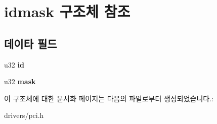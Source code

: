\section{idmask 구조체 참조}
\label{structidmask}
\subsection*{데이타 필드}
\begin{DoxyCompactItemize}
\item 
u32 {\bfseries id}\label{structidmask_a3501aa101a72a5acae8fc081f8f3f412}

\item 
u32 {\bfseries mask}\label{structidmask_af8208b4c461c5a03ac81aecfbf557fc1}

\end{DoxyCompactItemize}


이 구조체에 대한 문서화 페이지는 다음의 파일로부터 생성되었습니다.\-:\begin{DoxyCompactItemize}
\item 
drivers/pci.\-h\end{DoxyCompactItemize}
